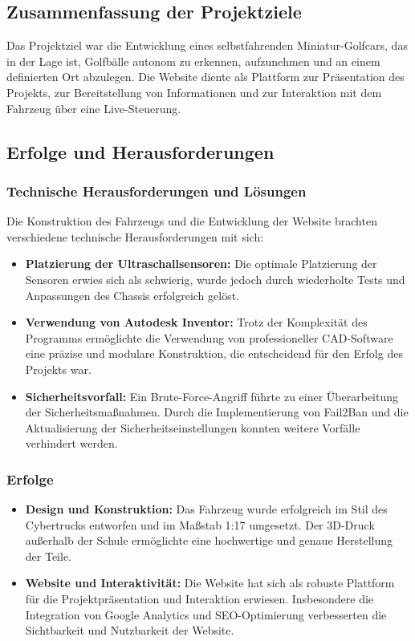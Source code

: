 \subsection{Zusammenfassung der Projektziele}
Das Projektziel war die Entwicklung eines selbstfahrenden Miniatur-Golfcars, das in der Lage ist, Golfbälle autonom zu erkennen, aufzunehmen und an einem definierten Ort abzulegen. Die Website diente als Plattform zur Präsentation des Projekts, zur Bereitstellung von Informationen und zur Interaktion mit dem Fahrzeug über eine Live-Steuerung.

\subsection{Erfolge und Herausforderungen}
\subsubsection{Technische Herausforderungen und Lösungen}
Die Konstruktion des Fahrzeugs und die Entwicklung der Website brachten verschiedene technische Herausforderungen mit sich:
\begin{itemize}
    \item \textbf{Platzierung der Ultraschallsensoren:} Die optimale Platzierung der Sensoren erwies sich als schwierig, wurde jedoch durch wiederholte Tests und Anpassungen des Chassis erfolgreich gelöst.
    \item \textbf{Verwendung von Autodesk Inventor:} Trotz der Komplexität des Programms ermöglichte die Verwendung von professioneller CAD-Software eine präzise und modulare Konstruktion, die entscheidend für den Erfolg des Projekts war.
    \item \textbf{Sicherheitsvorfall:} Ein Brute-Force-Angriff führte zu einer Überarbeitung der Sicherheitsmaßnahmen. Durch die Implementierung von Fail2Ban und die Aktualisierung der Sicherheitseinstellungen konnten weitere Vorfälle verhindert werden.
\end{itemize}

\subsubsection{Erfolge}
\begin{itemize}
    \item \textbf{Design und Konstruktion:} Das Fahrzeug wurde erfolgreich im Stil des Cybertrucks entworfen und im Maßstab 1:17 umgesetzt. Der 3D-Druck außerhalb der Schule ermöglichte eine hochwertige und genaue Herstellung der Teile.
    \item \textbf{Website und Interaktivität:} Die Website hat sich als robuste Plattform für die Projektpräsentation und Interaktion erwiesen. Insbesondere die Integration von Google Analytics und SEO-Optimierung verbesserten die Sichtbarkeit und Nutzbarkeit der Website.
\end{itemize}

